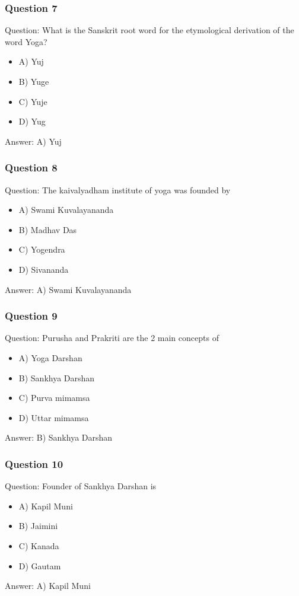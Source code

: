 \begin{frame}[fragile]\frametitle{Question 7}
Question: What is the Sanskrit root word for the etymological derivation of the word Yoga?
\begin{itemize}
\item A) Yuj
\item B) Yuge
\item C) Yuje
\item D) Yug
\end{itemize}
Answer: A) Yuj
\end{frame}

\begin{frame}[fragile]\frametitle{Question 8}
Question: The kaivalyadham institute of yoga was founded by
\begin{itemize}
\item A) Swami Kuvalayananda
\item B) Madhav Das
\item C) Yogendra
\item D) Sivananda
\end{itemize}
Answer: A) Swami Kuvalayananda
\end{frame}

\begin{frame}[fragile]\frametitle{Question 9}
Question: Purusha and Prakriti are the 2 main concepts of
\begin{itemize}
\item A) Yoga Darshan
\item B) Sankhya Darshan
\item C) Purva mimamsa
\item D) Uttar mimamsa
\end{itemize}
Answer: B) Sankhya Darshan
\end{frame}

\begin{frame}[fragile]\frametitle{Question 10}
Question: Founder of Sankhya Darshan is
\begin{itemize}
\item A) Kapil Muni
\item B) Jaimini
\item C) Kanada
\item D) Gautam
\end{itemize}
Answer: A) Kapil Muni
\end{frame}

